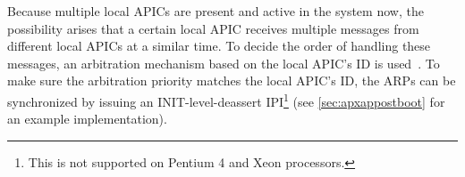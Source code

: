Because multiple local APICs are present and active in the system now, the possibility arises that
a certain local APIC receives multiple messages from different local APICs at a similar time. To
decide the order of handling these messages, an arbitration mechanism based on the local APIC's ID
is used~\cite[sec.~3.11.7]{ia32}. To make sure the arbitration priority matches the local APIC's
ID, the ARPs can be synchronized by issuing an INIT-level-deassert IPI\footnote{This is not
  supported on Pentium 4 and Xeon processors.} (see \autoref{sec:apxappostboot} for an example
implementation).

\clearpage
